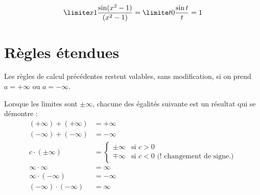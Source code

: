 \begin{frame}%
  \begin{example}
    \begin{equation*}
      \limite x 1 \frac{\sin (x^{2}-1)}{(x^{2}-1)} =       \limite t 0 \frac{\sin t}{t} = 1
    \end{equation*}
  \end{example}
\end{frame}

\section{Règles étendues}
\label{sec:regles-etendues}
\begin{frame}
  \begin{proposition}
    Les règles de calcul précédentes restent valables, sans modification, si on prend $a = +\infty$ ou $a = -\infty$.
  \end{proposition}

  \begin{proposition}
    Lorsque les limites sont \(\pm\infty\), chacune des \og égalités\fg{} suivante est un résultat qui se démontre :
    \begin{align*}
      (+\infty) + (+\infty) &= +\infty\\
      (-\infty) + (-\infty) &=-\infty\\
      c \cdot (\pm \infty)&=
                            \begin{cases}
                              \pm \infty &\textrm{si } c > 0\\
                              \mp \infty &\textrm{si } c < 0 \text{ (! changement de signe.)}
                            \end{cases}\\
      \infty \cdot \infty&=\infty\\
      \infty \cdot (-\infty)&=-\infty\\
      (-\infty) \cdot (-\infty)&=\infty
    \end{align*}
  \end{proposition}
\end{frame}

